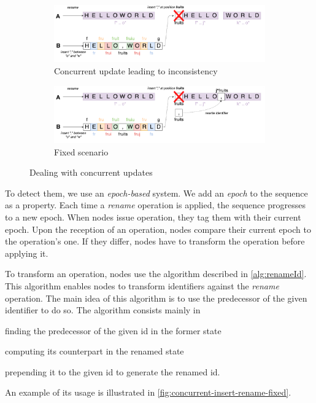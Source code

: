 \documentclass[sigplan,10pt]{acmart}
\begin{document}
\begin{figure}
    \begin{subfigure}{\columnwidth}
        \centering
        \includegraphics[width=0.9\columnwidth]{img/concurrent-insert-rename-inconsistent.png}
        \caption{Concurrent update leading to inconsistency}
        \label{fig:concurrent-insert-rename-inconsistent}
    \end{subfigure}
    \begin{subfigure}{\columnwidth}
        \centering
        \includegraphics[width=0.9\columnwidth]{img/concurrent-insert-rename-fixed.png}
        \caption{Fixed scenario}
        \label{fig:concurrent-insert-rename-fixed}
    \end{subfigure}
    \caption{Dealing with concurrent updates}
    \label{fig:concurrent-insert-rename}
\end{figure}

To detect them, we use an \emph{epoch-based} system.
We add an \emph{epoch} to the sequence as a property.
Each time a \emph{rename} operation is applied, the sequence progresses to a new epoch.
When nodes issue operation, they tag them with their current epoch.
Upon the reception of an operation, nodes compare their current epoch to the operation's one.
If they differ, nodes have to transform the operation before applying it.

To transform an operation, nodes use the algorithm described in \autoref{alg:renameId}.
This algorithm enables nodes to transform identifiers against the \emph{rename} operation.
The main idea of this algorithm is to use the predecessor of the given identifier to do so.
The algorithm consists mainly in
\begin{enumerate*}
    \item finding the predecessor of the given id in the former state
    \item computing its counterpart in the renamed state
    \item prepending it to the given id to generate the renamed id.
\end{enumerate*}
An example of its usage is illustrated in \autoref{fig:concurrent-insert-rename-fixed}.
\end{document}
